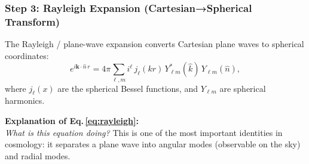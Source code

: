 \subsubsection{Step 3: Rayleigh Expansion (Cartesian→Spherical Transform)}

The Rayleigh / plane-wave expansion converts Cartesian plane waves to spherical coordinates:
\begin{equation}
    e^{i\mathbf{k}\cdot\hat{n}\,r} = 4\pi \sum_{\ell,m} i^\ell\,
    j_\ell(kr)\,Y^*_{\ell m}(\hat{k})\,Y_{\ell m}(\hat{n}),
    \label{eq:rayleigh}
\end{equation}
where $j_\ell(x)$ are the spherical Bessel functions, and $Y_{\ell m}$ are spherical harmonics.

\noindent\textbf{\large Explanation of Eq.\,\eqref{eq:rayleigh}:}\\
\textit{What is this equation doing?} This is one of the most important identities in cosmology: it separates a plane wave into angular modes (observable on the sky) and radial modes.
